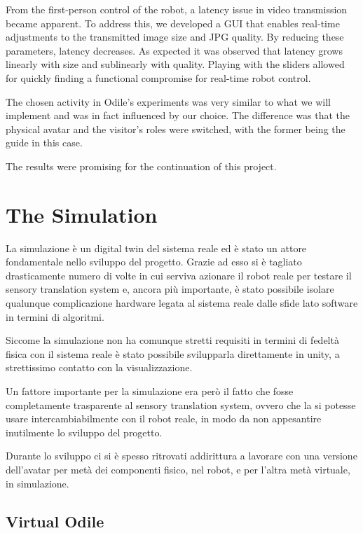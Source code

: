 \documentclass{Configuration_Files/PoliMi3i_thesis}
\begin{document}
From the first-person control of the robot, a latency issue in video transmission became apparent. To address this, we developed a GUI that enables real-time adjustments to the transmitted image size and JPG quality. By reducing these parameters, latency decreases. As expected it was observed that latency grows linearly with size and sublinearly with quality. Playing with the sliders allowed for quickly finding a functional compromise for real-time robot control.

The chosen activity in Odile's experiments was very similar to what we will implement and was in fact influenced by our choice. The difference was that the physical avatar and the visitor's roles were switched, with the former being the guide in this case.

The results were promising for the continuation of this project.

\section{The Simulation}

La simulazione è un digital twin del sistema reale ed è stato un attore fondamentale nello sviluppo del progetto. Grazie ad esso si è tagliato drasticamente numero di volte in cui serviva azionare il robot reale per testare il sensory translation system e, ancora più importante, è stato possibile isolare qualunque complicazione hardware legata al sistema reale dalle sfide lato software in termini di algoritmi.

Siccome la simulazione non ha comunque stretti requisiti in termini di fedeltà fisica con il sistema reale è stato possibile svilupparla direttamente in unity, a strettissimo contatto con la visualizzazione.

Un fattore importante per la simulazione era però il fatto che fosse completamente trasparente al sensory translation system, ovvero che la si potesse usare intercambiabilmente con il robot reale, in modo da non appesantire inutilmente lo sviluppo del progetto.

Durante lo sviluppo ci si è spesso ritrovati addirittura a lavorare con una versione dell’avatar per metà dei componenti fisico, nel robot, e per l’altra metà virtuale, in simulazione.

\subsection{Virtual Odile}
\end{document}
